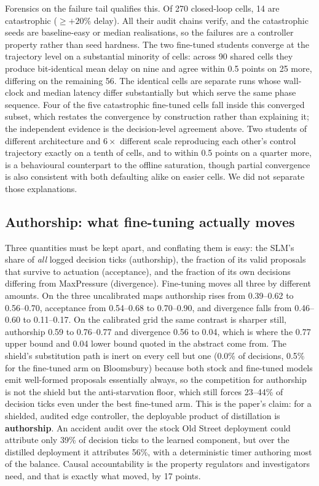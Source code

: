 \documentclass[conference]{IEEEtran}
\begin{document}
Forensics on the failure tail qualifies this. Of 270 closed-loop cells, 14
are catastrophic ($\ge{+}20\%$ delay). All their audit chains verify, and
the catastrophic seeds are baseline-easy or median realisations, so the
failures are a controller property rather than seed hardness. The two
fine-tuned students converge at the trajectory level on a substantial
minority of cells: across 90 shared cells they produce bit-identical mean
delay on nine and agree within 0.5 points on 25 more, differing on the
remaining 56. The identical cells are separate runs whose wall-clock and median
latency differ substantially but which serve the same phase sequence.
Four of the five catastrophic fine-tuned cells fall inside this converged
subset, which restates the convergence by construction rather than
explaining it; the independent evidence is the decision-level agreement
above. Two students of
different architecture and $6\times$ different scale reproducing each
other's control trajectory exactly on a tenth of cells, and to within 0.5
points on a quarter more, is a behavioural
counterpart to the offline saturation, though partial convergence is also
consistent with both defaulting alike on easier cells. We did not separate
those explanations.

\subsection{Authorship: what fine-tuning actually moves}
Three quantities must be kept apart, and conflating them is easy: the SLM's
share of \emph{all} logged decision ticks (authorship), the fraction of its
valid proposals that survive to actuation (acceptance), and the fraction of
its own decisions differing from MaxPressure (divergence). Fine-tuning moves
all three by different amounts. On the three uncalibrated maps authorship
rises from 0.39--0.62 to 0.56--0.70, acceptance from 0.54--0.68 to
0.70--0.90, and divergence falls from 0.46--0.60 to 0.11--0.17. On the
calibrated grid the same contrast is sharper still, authorship 0.59 to
0.76--0.77 and divergence 0.56 to 0.04, which is where the 0.77 upper bound and
0.04 lower bound quoted in the abstract come from. The shield's
substitution path is inert on every cell but one (0.0\% of decisions,
0.5\% for the fine-tuned arm on Bloomsbury) because both stock and
fine-tuned models emit well-formed proposals essentially always, so the
competition for authorship is not the shield but the anti-starvation
floor, which still forces 23--44\% of decision ticks even under the best
fine-tuned arm.
This is the paper's claim: for a shielded, audited edge controller, the
deployable product of distillation is \textbf{authorship}. An accident audit
over the stock Old Street deployment could attribute only 39\% of decision ticks
to the learned component, but over the distilled deployment it attributes
56\%, with a deterministic timer authoring most of the balance. Causal
accountability is the property regulators and investigators need, and that
is exactly what moved, by 17 points.
\end{document}
